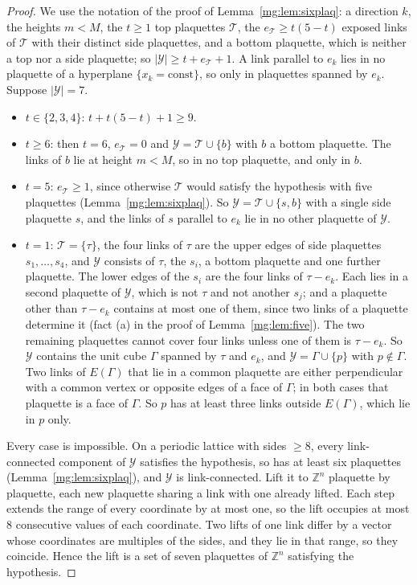 \documentclass[11pt,a4paper]{article}
\theoremstyle{definition}
\theoremstyle{remark}
\newcommand{\Z}{\mathbb{Z}}
\begin{document}
\begin{proof}
We use the notation of the proof of Lemma~\ref{mg:lem:sixplaq}: a direction $k$, the heights $m<M$, the $t\ge1$ top plaquettes $\mathcal T$, the $e_{\mathcal T}\ge t(5-t)$ exposed
links of $\mathcal T$ with their distinct side plaquettes, and a bottom plaquette, which is neither a top nor a side plaquette; so $|\mathcal Y|\ge t+e_{\mathcal T}+1$. A link parallel
to $e_k$ lies in no plaquette of a hyperplane $\{x_k=\mathrm{const}\}$, so only in plaquettes spanned by $e_k$. Suppose $|\mathcal Y|=7$.
\begin{itemize}
\item $t\in\{2,3,4\}$: $t+t(5-t)+1\ge9$.
\item $t\ge6$: then $t=6$, $e_{\mathcal T}=0$ and $\mathcal Y=\mathcal T\cup\{b\}$ with $b$ a bottom plaquette. The links of $b$ lie at height $m<M$, so in no top plaquette, and
only in $b$.
\item $t=5$: $e_{\mathcal T}\ge1$, since otherwise $\mathcal T$ would satisfy the hypothesis with five plaquettes (Lemma~\ref{mg:lem:sixplaq}). So $\mathcal Y=\mathcal T\cup\{s,b\}$
with a single side plaquette $s$, and the links of $s$ parallel to $e_k$ lie in no other plaquette of $\mathcal Y$.
\item $t=1$: $\mathcal T=\{\tau\}$, the four links of $\tau$ are the upper edges of side plaquettes $s_1,\dots,s_4$, and $\mathcal Y$ consists of $\tau$, the $s_i$, a bottom
plaquette and one further plaquette. The lower edges of the $s_i$ are the four links of $\tau-e_k$. Each lies in a second plaquette of $\mathcal Y$, which is not $\tau$ and not
another $s_j$; and a plaquette other than $\tau-e_k$ contains at most one of them, since two links of a plaquette determine it (fact (a) in the proof of
Lemma~\ref{mg:lem:five}). The two remaining plaquettes cannot cover four links unless one of them is $\tau-e_k$. So $\mathcal Y$ contains the unit cube $\Gamma$ spanned by $\tau$
and $e_k$, and $\mathcal Y=\Gamma\cup\{p\}$ with $p\notin\Gamma$. Two links of $E(\Gamma)$ that lie in a common plaquette are either perpendicular with a common vertex or opposite
edges of a face of $\Gamma$; in both cases that plaquette is a face of $\Gamma$. So $p$ has at least three links outside $E(\Gamma)$, which lie in $p$ only.
\end{itemize}
Every case is impossible. On a periodic lattice with sides $\ge8$, every link-connected component of $\mathcal Y$ satisfies the hypothesis, so has at least six plaquettes
(Lemma~\ref{mg:lem:sixplaq}), and $\mathcal Y$ is link-connected. Lift it to $\Z^n$ plaquette by plaquette, each new plaquette sharing a link with one already lifted. Each step
extends the range of every coordinate by at most one, so the lift occupies at most $8$ consecutive values of each coordinate. Two lifts of one link differ by a vector whose
coordinates are multiples of the sides, and they lie in that range, so they coincide. Hence the lift is a set of seven plaquettes of $\Z^n$ satisfying the hypothesis.
\end{proof}
\end{document}
